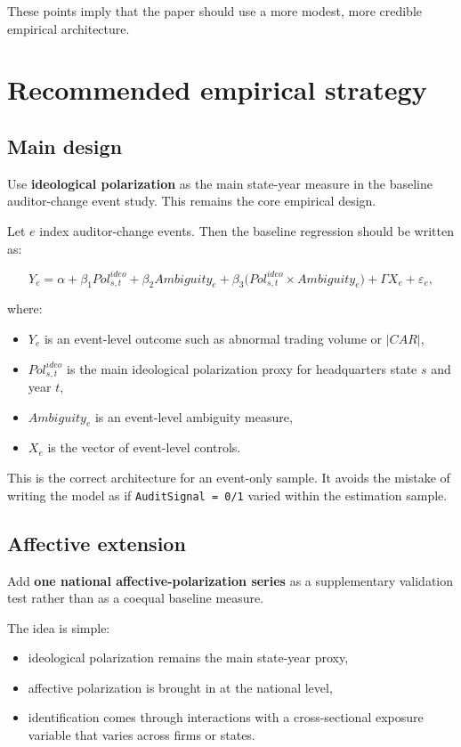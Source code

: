 \documentclass[12pt]{article}
\begin{document}
These points imply that the paper should use a more modest, more credible empirical architecture.

\section{Recommended empirical strategy}

\subsection{Main design}

Use \textbf{ideological polarization} as the main state-year measure in the baseline auditor-change event study. This remains the core empirical design.

Let $e$ index auditor-change events. Then the baseline regression should be written as:

\begin{equation}
Y_e = \alpha + \beta_1 Pol^{ideo}_{s,t} + \beta_2 Ambiguity_e + \beta_3\big(Pol^{ideo}_{s,t} \times Ambiguity_e\big) + \Gamma X_e + \varepsilon_e,
\end{equation}

where:
\begin{itemize}[leftmargin=1.5em]
    \item $Y_e$ is an event-level outcome such as abnormal trading volume or $|CAR|$,
    \item $Pol^{ideo}_{s,t}$ is the main ideological polarization proxy for headquarters state $s$ and year $t$,
    \item $Ambiguity_e$ is an event-level ambiguity measure,
    \item $X_e$ is the vector of event-level controls.
\end{itemize}

This is the correct architecture for an event-only sample. It avoids the mistake of writing the model as if \texttt{AuditSignal = 0/1} varied within the estimation sample.

\subsection{Affective extension}

Add \textbf{one national affective-polarization series} as a supplementary validation test rather than as a coequal baseline measure.

The idea is simple:
\begin{itemize}[leftmargin=1.5em]
    \item ideological polarization remains the main state-year proxy,
    \item affective polarization is brought in at the national level,
    \item identification comes through interactions with a cross-sectional exposure variable that varies across firms or states.
\end{itemize}
\end{document}

